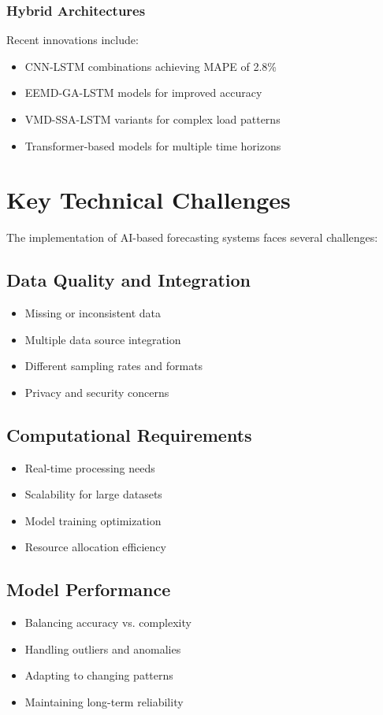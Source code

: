 \documentclass[12pt,a4paper]{report}
\begin{document}
\subsubsection{Hybrid Architectures}
Recent innovations include:
\begin{itemize}
\item CNN-LSTM combinations achieving MAPE of 2.8\%
\item EEMD-GA-LSTM models for improved accuracy
\item VMD-SSA-LSTM variants for complex load patterns
\item Transformer-based models for multiple time horizons
\end{itemize}

\section{Key Technical Challenges}
The implementation of AI-based forecasting systems faces several challenges:

\subsection{Data Quality and Integration}
\begin{itemize}
\item Missing or inconsistent data
\item Multiple data source integration
\item Different sampling rates and formats
\item Privacy and security concerns
\end{itemize}

\subsection{Computational Requirements}
\begin{itemize}
\item Real-time processing needs
\item Scalability for large datasets
\item Model training optimization
\item Resource allocation efficiency
\end{itemize}

\subsection{Model Performance}
\begin{itemize}
\item Balancing accuracy vs. complexity
\item Handling outliers and anomalies
\item Adapting to changing patterns
\item Maintaining long-term reliability
\end{itemize}
\end{document}
